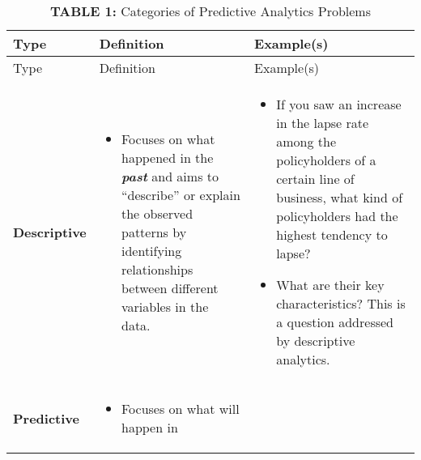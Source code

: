 \documentclass[
  12pt,
]{krantz}
\providecommand{\tightlist}{%
  \setlength{\itemsep}{0pt}\setlength{\parskip}{0pt}}
\begin{document}
\begin{longtable}[]{@{}
  >{\raggedright\arraybackslash}p{}
  >{\raggedright\arraybackslash}p{}
  >{\raggedright\arraybackslash}p{}@{}}
\caption{\textbf{TABLE 1:} Categories of Predictive Analytics Problems}\tabularnewline
\toprule\noalign{}
\begin{minipage}[b]{\linewidth}\raggedright
Type
\end{minipage} & \begin{minipage}[b]{\linewidth}\raggedright
Definition
\end{minipage} & \begin{minipage}[b]{\linewidth}\raggedright
Example(s)
\end{minipage} \\
\midrule\noalign{}
\endfirsthead
\toprule\noalign{}
\begin{minipage}[b]{\linewidth}\raggedright
Type
\end{minipage} & \begin{minipage}[b]{\linewidth}\raggedright
Definition
\end{minipage} & \begin{minipage}[b]{\linewidth}\raggedright
Example(s)
\end{minipage} \\
\midrule\noalign{}
\endhead
\bottomrule\noalign{}
\endlastfoot
\textbf{Descriptive} & \begin{minipage}[t]{\linewidth}\raggedright
\begin{itemize}
\tightlist
\item
  Focuses on what
  happened in the
  \textbf{\emph{past}} and aims
  to ``describe'' or
  explain the
  observed patterns
  by identifying
  relationships
  between different
  variables in the
  data.
\end{itemize}
\end{minipage} & \begin{minipage}[t]{\linewidth}\raggedright
\begin{itemize}
\tightlist
\item
  If you saw an
  increase in the
  lapse rate among
  the policyholders
  of a certain line
  of business, what
  kind of
  policyholders had
  the highest
  tendency to lapse?
\item
  What are their key
  characteristics?
  This is a question
  addressed by
  descriptive
  analytics.
\end{itemize}
\end{minipage} \\
\textbf{Predictive} & \begin{minipage}[t]{\linewidth}\raggedright
\begin{itemize}
\tightlist
\item
  Focuses on what
  will happen in
\end{itemize}


\end{minipage}
\end{longtable}
\end{document}
